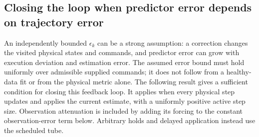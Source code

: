 \subsection{Closing the loop when predictor error depends on trajectory error}
\label{app:smallgain}

An independently bounded $\epsilon_k$ can be a strong assumption: a correction
changes the visited physical states and commands, and predictor error can
grow with execution deviation and estimation error. The assumed error bound
must hold uniformly over admissible supplied commands; it does not follow
from a healthy-data fit or from the physical metric alone. The following result gives a sufficient
condition for closing this feedback loop. It applies when every physical step updates and applies the current estimate,
with a uniformly positive active step size. Observation attenuation is included
by adding its forcing to the constant observation-error term below. Arbitrary
holds and delayed application instead use the scheduled tube.

